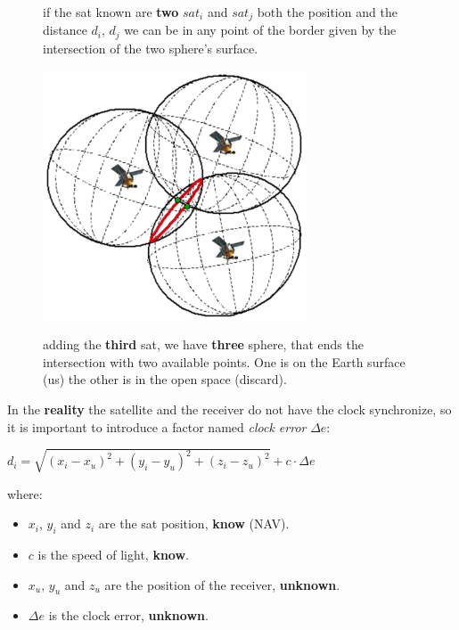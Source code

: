 \begin{figure}[h]
\begin{minipage}[t]{0.3\textwidth}
        \begin{flushleft}
            if the sat known are \textbf{two} $sat_i$ and $sat_j$ both the position and the distance $d_i$, $d_j$ we can be in any point of the border given by the intersection of the two sphere's surface.
        \end{flushleft}
    \end{minipage}
    \begin{minipage}[t]{0.3\textwidth}
        \centering
        \includegraphics[width=0.7\textwidth]{img/gps_three}

        \begin{flushleft}
            adding the \textbf{third} sat, we have \textbf{three} sphere, that ends the intersection with two available points. One is on the Earth surface (us) the other is in the open space (discard).
        \end{flushleft}
    \end{minipage}
\end{figure}
In the \textbf{reality} the satellite and the receiver do not have the clock synchronize, so it is important to introduce a factor named \textit{clock error} $\Delta e$:
\begin{center}
    $d_i = \sqrt{(x_i - x_u)^2 + (y_i - y_u)^2 + (z_i - z_u)^2} + c \cdot \Delta e$
\end{center}
where:
\begin{itemize}[nosep]
    \item $x_i$, $y_i$ and $z_i$ are the sat position, \textbf{know} (NAV).
    \item $c$ is the speed of light, \textbf{know}.
    \item $x_u$, $y_u$ and $z_u$ are the position of the receiver, \textbf{unknown}.
    \item $\Delta e$ is the clock error, \textbf{unknown}.
\end{itemize}
